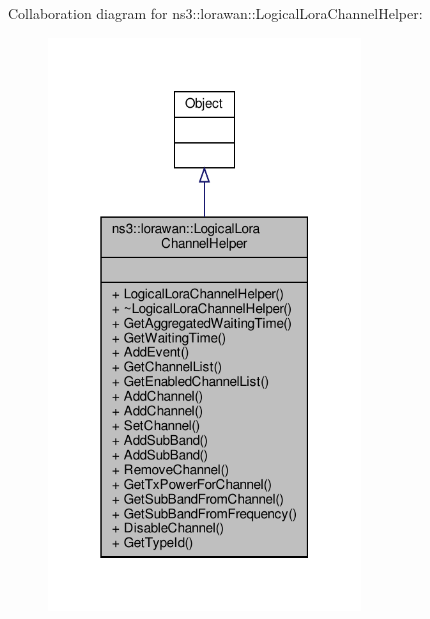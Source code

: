 Collaboration diagram for ns3\+:\+:lorawan\+:\+:Logical\+Lora\+Channel\+Helper\+:
\nopagebreak
\begin{figure}[H]
\begin{center}
\leavevmode
\includegraphics[width=235pt]{classns3_1_1lorawan_1_1LogicalLoraChannelHelper__coll__graph}
\end{center}
\end{figure}
